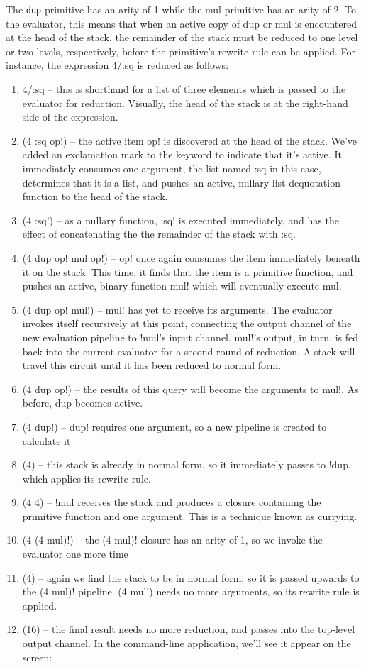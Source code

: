 \documentclass[runningheads]{llncs}
\begin{document}
The \texttt{dup} primitive has an arity of 1 while the mul primitive has an arity of 2.  To the evaluator, this means that when an active copy of dup or mul is encountered at the head of the stack, the remainder of the stack must be reduced to one level or two levels, respectively, before the primitive's rewrite rule can be applied.  For instance, the expression 4/:sq is reduced as follows:
\begin{enumerate}
\item 4/:sq -- this is shorthand for a list of three elements which is passed to the evaluator for reduction.  Visually, the head of the stack is at the right-hand side of the expression.
\item (4 :sq op!) -- the active item op! is discovered at the head of the stack.  We've added an exclamation mark to the keyword to indicate that it's active.  It immediately consumes one argument, the list named :sq in this case, determines that it is a list, and pushes an active, nullary list dequotation function to the head of the stack.
\item (4 :sq!) --  as a nullary function, :sq! is executed immediately, and has the effect of concatenating the the remainder of the stack with :sq.
\item (4 dup op! mul op!) -- op! once again consumes the item immediately beneath it on the stack.  This time, it finds that the item is a primitive function, and pushes an active, binary function mul! which will eventually execute mul.
\item (4 dup op! mul!) -- mul! has yet to receive its arguments.  The evaluator invokes itself recursively at this point, connecting the output channel of the new evaluation pipeline to !mul's input channel.  mul!'s output, in turn, is fed back into the current evaluator for a second round of reduction.  A stack will travel this circuit until it has been reduced to normal form.
\item (4 dup op!) -- the results of this query will become the arguments to mul!.  As before, dup becomes active.
\item (4 dup!) -- dup! requires one argument, so a new pipeline is created to calculate it
\item (4) -- this stack is already in normal form, so it immediately passes to !dup, which applies its rewrite rule.
\item (4 4) -- !mul receives the stack and produces a closure containing the primitive function and one argument.  This is a technique known as currying.
\item (4 (4 mul)!) -- the (4 mul)! closure has an arity of 1, so we invoke the evaluator one more time
\item (4) -- again we find the stack to be in normal form, so it is passed upwards to the (4 mul)! pipeline.  (4 mul!) needs no more arguments, so its rewrite rule is applied.
\item (16) -- the final result needs no more reduction, and passes into the top-level output channel.  In the command-line application, we'll see it appear on the screen:
\end{enumerate}
\end{document}
